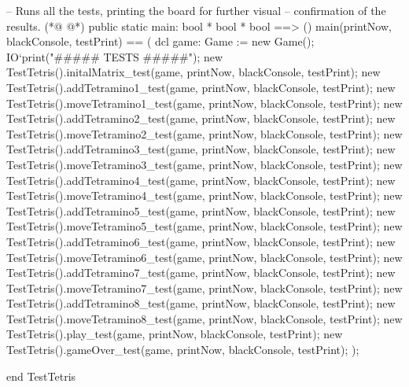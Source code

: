 \begin{vdmpp}[breaklines=true]
  -- Runs all the tests, printing the board for further visual 
  -- confirmation of the results.
(*@
\label{main:556}
@*)
  public static main: bool * bool * bool ==> ()
  main(printNow, blackConsole, testPrint) == (
   dcl game: Game := new Game();
   IO`print("\n##### TESTS #####\n");
   new TestTetris().initalMatrix_test(game, printNow, blackConsole, testPrint);
   new TestTetris().addTetramino1_test(game, printNow, blackConsole, testPrint);
   new TestTetris().moveTetramino1_test(game, printNow, blackConsole, testPrint);
   new TestTetris().addTetramino2_test(game, printNow, blackConsole, testPrint);
   new TestTetris().moveTetramino2_test(game, printNow, blackConsole, testPrint);
   new TestTetris().addTetramino3_test(game, printNow, blackConsole, testPrint);
   new TestTetris().moveTetramino3_test(game, printNow, blackConsole, testPrint);
   new TestTetris().addTetramino4_test(game, printNow, blackConsole, testPrint);
   new TestTetris().moveTetramino4_test(game, printNow, blackConsole, testPrint);
   new TestTetris().addTetramino5_test(game, printNow, blackConsole, testPrint);
   new TestTetris().moveTetramino5_test(game, printNow, blackConsole, testPrint);
   new TestTetris().addTetramino6_test(game, printNow, blackConsole, testPrint);
   new TestTetris().moveTetramino6_test(game, printNow, blackConsole, testPrint);
   new TestTetris().addTetramino7_test(game, printNow, blackConsole, testPrint);
   new TestTetris().moveTetramino7_test(game, printNow, blackConsole, testPrint);
   new TestTetris().addTetramino8_test(game, printNow, blackConsole, testPrint);
   new TestTetris().moveTetramino8_test(game, printNow, blackConsole, testPrint);
   new TestTetris().play_test(game, printNow, blackConsole, testPrint);
   new TestTetris().gameOver_test(game, printNow, blackConsole, testPrint);
  );
  
end TestTetris
\end{vdmpp}
\bigskip
